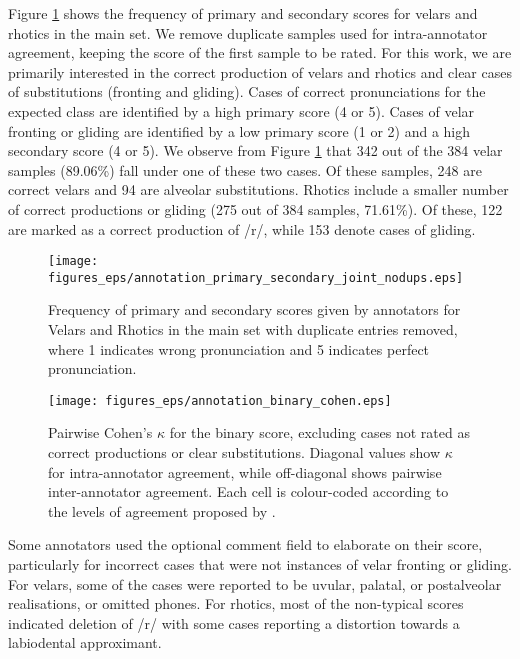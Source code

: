 Figure \ref{fig:annotation-primary-secondary-matrix} shows the frequency of primary and secondary scores for velars and rhotics in the main set. 
We remove duplicate samples used for intra-annotator agreement, keeping the score of the first sample to be rated.
For this work, we are primarily interested in the correct production of velars and rhotics and clear cases of substitutions (fronting and gliding).
Cases of correct pronunciations for the expected class are identified by a high primary score (4 or 5).
Cases of velar fronting or gliding are identified by a low primary score (1 or 2) and a high secondary score (4 or 5).
We observe from Figure \ref{fig:annotation-primary-secondary-matrix} that 342 out of the 384 velar samples (89.06\%) fall under one of these two cases.
Of these samples, 248 are correct velars and 94 are alveolar substitutions.
Rhotics include a smaller number of correct productions or gliding (275 out of 384 samples, 71.61\%).
Of these, 122 are marked as a correct production of /r/, while 153 denote cases of gliding.

\begin{figure}[t]
\texttt{[image: figures\_eps/annotation\_primary\_secondary\_joint\_nodups.eps]}
\caption{\label{fig:annotation-primary-secondary-matrix} Frequency of primary and secondary scores given by annotators for Velars and Rhotics in the main set with duplicate entries removed, where 1 indicates wrong pronunciation and 5 indicates perfect pronunciation.}
\end{figure}

\begin{figure*}
\centering
\texttt{[image: figures\_eps/annotation\_binary\_cohen.eps]}
\caption{\label{fig:annotation-cohen-kappa} Pairwise Cohen's $\kappa$ for the binary score, excluding cases not rated as correct productions or clear substitutions. Diagonal values show $\kappa$ for intra-annotator agreement, while off-diagonal shows pairwise inter-annotator agreement. Each cell is colour-coded according to the levels of agreement proposed by \citet[pp 164-165]{landis1977measurement}.}
\end{figure*}

Some annotators used the optional comment field to elaborate on their score, particularly for incorrect cases that were not instances of velar fronting or gliding.
For velars, some of the cases were reported to be uvular, palatal, or postalveolar realisations, or omitted phones.
For rhotics, most of the non-typical scores indicated deletion of /r/ with some cases reporting a distortion towards a labiodental approximant.

